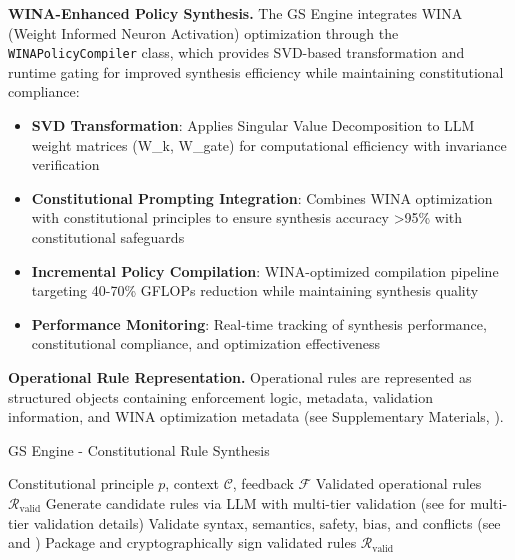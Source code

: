 \documentclass[manuscript,screen,review,anonymous,9pt]{acmart}
\begin{document}
\textbf{WINA-Enhanced Policy Synthesis.} The GS Engine integrates WINA (Weight Informed Neuron Activation) optimization \cite{WINA2024NeuronActivation} through the \texttt{WINAPolicyCompiler} class, which provides SVD-based transformation and runtime gating for improved synthesis efficiency while maintaining constitutional compliance:

\begin{itemize}
	\item \textbf{SVD Transformation}: Applies Singular Value Decomposition to LLM weight matrices (W\_k, W\_gate) for computational efficiency with invariance verification \cite{SVDOptimization2024}
	\item \textbf{Constitutional Prompting Integration}: Combines WINA optimization with constitutional principles to ensure synthesis accuracy >95\% with constitutional safeguards \cite{ConstitutionalCompliance2024}
	\item \textbf{Incremental Policy Compilation}: WINA-optimized compilation pipeline targeting 40-70\% GFLOPs reduction while maintaining synthesis quality
	\item \textbf{Performance Monitoring}: Real-time tracking of synthesis performance, constitutional compliance, and optimization effectiveness \cite{PerformanceMonitoring2024}
\end{itemize}

\textbf{Operational Rule Representation.} Operational rules are represented as structured objects containing enforcement logic, metadata, validation information, and WINA optimization metadata (see Supplementary Materials, ).

\begin{algorithm}[!htbp]
	\caption{GS Engine - Constitutional Rule Synthesis}
	\label{alg:gs_engine}
	\begin{algorithmic}[1]
		\Require Constitutional principle $p$, context $\mathcal{C}$, feedback $\mathcal{F}$
		\Ensure Validated operational rules $\mathcal{R}_{\text{valid}}$
		\State Generate candidate rules via LLM with multi-tier validation (see  for multi-tier validation details)
		\State Validate syntax, semantics, safety, bias, and conflicts (see  and )
		\State Package and cryptographically sign validated rules
		\State \Return $\mathcal{R}_{\text{valid}}$
		\EndFunction
	\end{algorithmic}
\end{algorithm}
\end{document}
